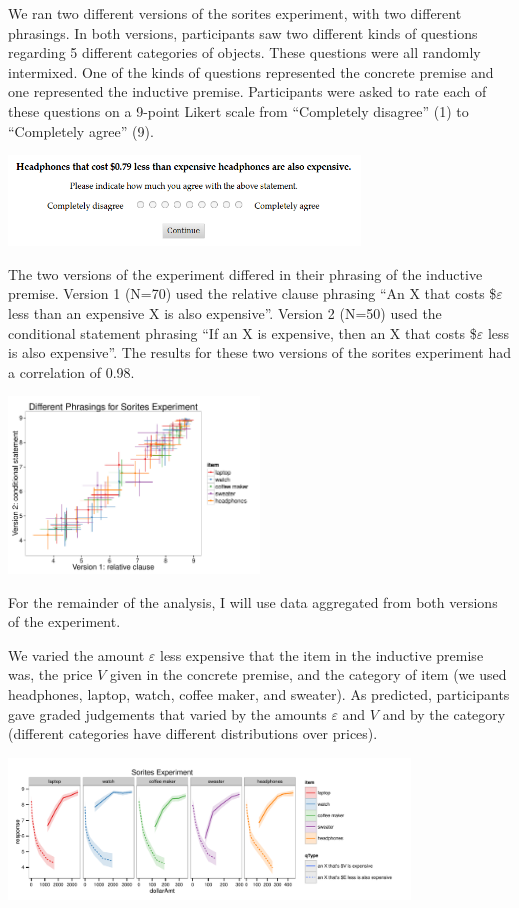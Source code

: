 \documentclass[10pt]{article}
\begin{document}
We ran two different versions of the sorites experiment, with two different phrasings. In both versions, participants saw two different kinds of questions regarding 5 different categories of objects. These questions were all randomly intermixed. One of the kinds of questions represented the concrete premise and one represented the inductive premise. Participants were asked to rate each of these questions on a 9-point Likert scale from ``Completely disagree'' (1) to ``Completely agree'' (9).

\includegraphics[width=0.7\textwidth]{screenshot3.png}

The two versions of the experiment differed in their phrasing of the inductive premise. Version 1 (N=70) used the relative clause phrasing ``An X that costs \$$\varepsilon$ less than an expensive X is also expensive''. Version 2 (N=50) used the conditional statement phrasing ``If an X is expensive, then an X that costs \$$\varepsilon$ less is also expensive''. The results for these two versions of the sorites experiment had a correlation of 0.98.

\includegraphics[width=0.5\textwidth]{phrasings.pdf}

For the remainder of the analysis, I will use data aggregated from both versions of the experiment.

We varied the amount $\varepsilon$ less expensive that the item in the inductive premise was, the price $V$ given in the concrete premise, and the category of item (we used headphones, laptop, watch, coffee maker, and sweater). As predicted, participants gave graded judgements that varied by the amounts $\varepsilon$ and $V$ and by the category (different categories have different distributions over prices).

\includegraphics[width=0.8\textwidth]{sorites-experiment.pdf}
\end{document}
